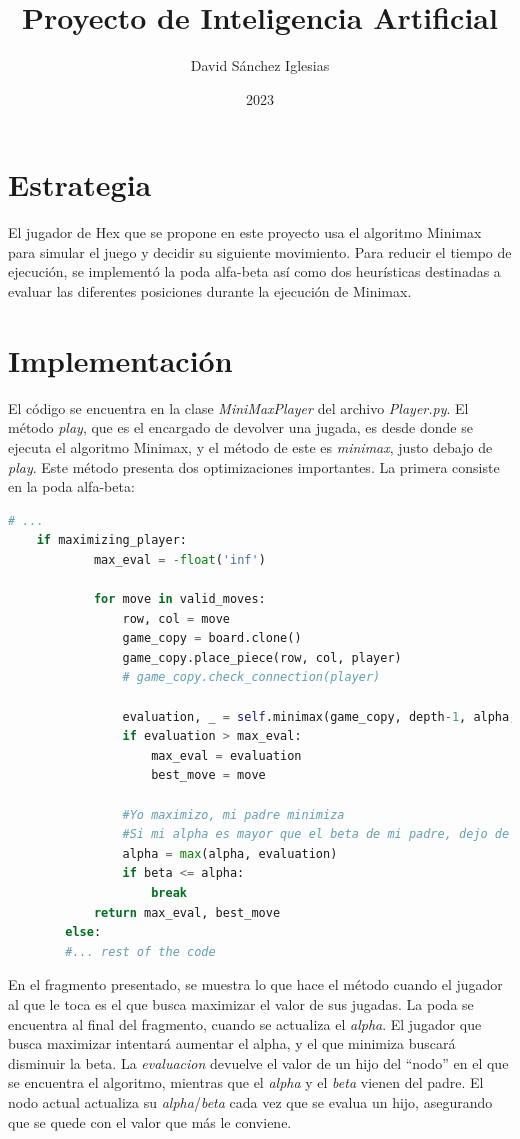 \documentclass[spanish]{article}
\title{Proyecto de Inteligencia Artificial}
\author{David Sánchez Iglesias}
\date{2023}
\begin{document}
\maketitle

\section{Estrategia}
El jugador de Hex que se propone en este proyecto usa el algoritmo Minimax para simular el juego y decidir su siguiente movimiento. Para reducir el tiempo de ejecución, se implementó la poda alfa-beta así como dos heurísticas destinadas a evaluar las diferentes posiciones durante la ejecución de Minimax.

\section{Implementación}
El código se encuentra en la clase \textit{MiniMaxPlayer} del archivo \textit{Player.py}. El método \textit{play}, que es el encargado de devolver una jugada, es desde donde se ejecuta el algoritmo Minimax, y el método de este es \textit{minimax}, justo debajo de \textit{play}.
Este m\'etodo presenta dos optimizaciones importantes. La primera consiste en la poda alfa-beta:
\begin{lstlisting}[language=Python]
    # ...
    if maximizing_player:
            max_eval = -float('inf')

            for move in valid_moves:
                row, col = move
                game_copy = board.clone()
                game_copy.place_piece(row, col, player)
                # game_copy.check_connection(player)
                
                evaluation, _ = self.minimax(game_copy, depth-1, alpha, beta, (3-player), False)
                if evaluation > max_eval:
                    max_eval = evaluation
                    best_move = move
                
                #Yo maximizo, mi padre minimiza
                #Si mi alpha es mayor que el beta de mi padre, dejo de buscar
                alpha = max(alpha, evaluation)
                if beta <= alpha:
                    break
            return max_eval, best_move
        else:
        #... rest of the code
\end{lstlisting}
En el fragmento presentado, se muestra lo que hace el m\'etodo cuando el jugador al que le toca es el que busca maximizar el valor de sus jugadas.
La poda se encuentra al final del fragmento, cuando se actualiza el \textit{alpha}. El jugador que busca maximizar intentar\'a aumentar el alpha, y el que minimiza buscar\'a disminuir la beta. La \textit{evaluacion} devuelve el valor de un hijo del ``nodo'' en el que se encuentra el algoritmo, mientras que el \textit{alpha} y el \textit{beta} vienen del padre. El nodo actual actualiza su \textit{alpha}/\textit{beta} cada vez que se evalua un hijo, asegurando que se quede con el valor que m\'as le conviene.
\end{document}
